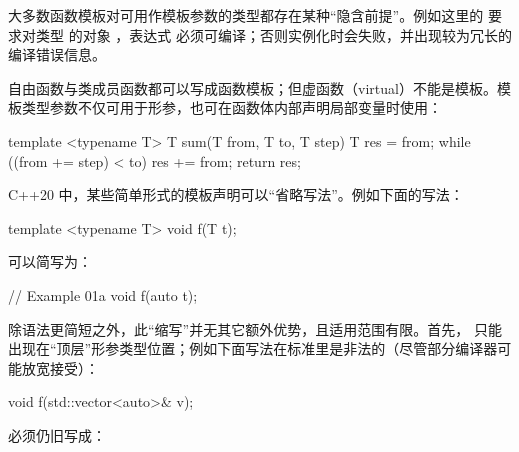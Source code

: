 大多数函数模板对可用作模板参数的类型都存在某种“隐含前提”。例如这里的  要求对类型  的对象 ，表达式  必须可编译；否则实例化时会失败，并出现较为冗长的编译错误信息。

自由函数与类成员函数都可以写成函数模板；但虚函数（virtual）不能是模板。模板类型参数不仅可用于形参，也可在函数体内部声明局部变量时使用：

\begin{code}
template <typename T> 
T sum(T from, T to, T step) {
  T res = from;
  while ((from += step) < to) { res += from; }
  return res;
}
\end{code}

C++20 中，某些简单形式的模板声明可以“省略写法”。例如下面的写法：

\begin{code}
template <typename T> void f(T t);
\end{code}

可以简写为：

\begin{code}
// Example 01a
void f(auto t);
\end{code}

除语法更简短之外，此“缩写”并无其它额外优势，且适用范围有限。首先， 只能出现在“顶层”形参类型位置；例如下面写法在标准里是非法的（尽管部分编译器可能放宽接受）：

\begin{code}
void f(std::vector<auto>& v);
\end{code}

必须仍旧写成：

